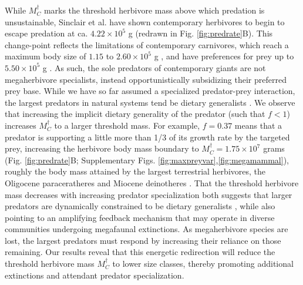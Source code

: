 \documentclass[]{rsos}%
\begin{document}
While $M_C^\dagger$ marks the threshold herbivore mass above which predation is unsustainable, Sinclair et al. \cite{Sinclair2003} have shown contemporary herbivores to begin to escape predation at ca. $4.22\times10^5$ g (redrawn in Fig. \ref{fig:predrate}B).
This change-point reflects the limitations of contemporary carnivores, which reach a maximum body size of $1.15$ to $2.60\times10^5$ g \cite{Sinclair2003,Hayward2005}, and have preferences for prey up to $5.50\times10^5$ g \cite{Hayward2005}.
As such, the sole predators of contemporary giants are not megaherbivore specialists, instead opportunistically subsidizing their preferred prey base. %
While we have so far assumed a specialized predator-prey interaction, the largest predators in natural systems tend be dietary generalists \cite{Sinclair2003}.
We observe that increasing the implicit dietary generality of the predator (such that $f<1$) increases $M_C^\dagger$ to a larger threshold mass.
For example, $f=0.37$ means that a predator is supporting a little more than 1/3 of its growth rate by the targeted prey, increasing the herbivore body mass boundary to $M_C^\dagger = 1.75\times10^7$ grams (Fig. \ref{fig:predrate}B; Supplementary Figs. \ref{fig:maxpreyvar},\ref{fig:megamammal}), roughly the body mass attained by the largest terrestrial herbivores, the Oligocene paraceratheres and Miocene deinotheres \cite{Smith:2010p3442,yeakel2018dynamics}.
That the threshold herbivore mass decreases with increasing predator specialization both suggests that larger predators are dynamically constrained to be dietary generalists \cite{Sinclair2003}, while also pointing to an amplifying feedback mechanism \cite{brook2008synergies} that may operate in diverse communities undergoing megafaunal extinctions.
As megaherbivore species are lost, the largest predators must respond by increasing their reliance on those remaining.
Our results reveal that this energetic redirection will reduce the threshold herbivore mass $M_C^\dagger$ to lower size classes, thereby promoting additional extinctions and attendant predator specialization.
\end{document}

